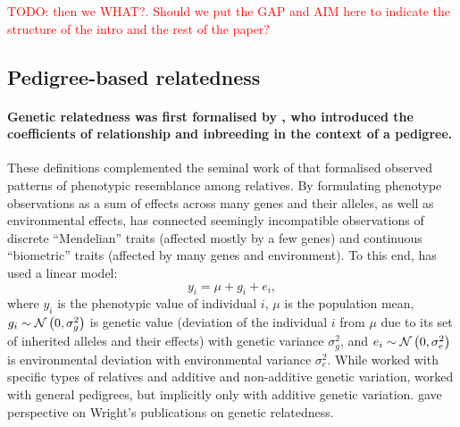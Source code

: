 \textcolor{red}{TODO: then we WHAT?. Should we put the GAP and AIM here to
indicate the structure of the intro and the rest of the paper?}


\subsection{Pedigree-based relatedness}


\paragraph{Genetic relatedness was first formalised by \cite{wright1922coefficients},
who introduced the coefficients of relationship and inbreeding in the
context of a pedigree.}
%
These definitions complemented the seminal work of \cite{fisher1919correlation}
that formalised observed patterns of phenotypic resemblance among relatives.
%
By formulating phenotype observations as a sum of effects across many genes 
and their alleles, as well as environmental effects,
\cite{fisher1919correlation} has connected seemingly incompatible
observations of discrete ``Mendelian'' traits (affected mostly by a few
genes) and continuous ``biometric'' traits (affected by many genes and
environment).
%
To this end, \cite{fisher1919correlation} has used a linear model:
%
\begin{equation}
  y_i = \mu + g_i + e_i,\label{eqn:fisher_pheno}
\end{equation}
%
where
$y_i$ is the phenotypic value of individual $i$,
$\mu$ is the population mean,
$g_i \sim \mathcal{N}\left(0, \sigma_g^2\right)$
is genetic value (deviation of the individual $i$ from $\mu$
due to its set of inherited alleles and their effects) with genetic
variance $\sigma_g^2$, and
$e_i \sim \mathcal{N}\left(0, \sigma_e^2\right)$
is environmental deviation with environmental variance $\sigma_e^2$.
%
While \cite{fisher1919correlation} worked with specific types of relatives
and additive and non-additive genetic variation,
\cite{wright1922coefficients} worked with general pedigrees,
but implicitly only with additive genetic variation.
%
\cite{hill1996sewall} gave perspective on Wright's publications on genetic
relatedness.

